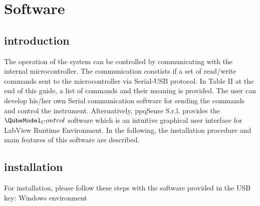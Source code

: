 
\newpage
\section{Software}
\subsection{introduction}
The operation of the \QubeModel  system can be controlled by communicating with the internal
microcontroller. The communication constists if a set of read/write commands sent to the
microcontroller via Serial-USB protocol. In Table II at the end of this guide, a list of commands and
their meaning is provided. The user can develop his/her own Serial communication software for
sending the commands and control the \QubeModel  instrument.
Alternatively, ppqSense S.r.l. provides the $\QubeModel _Control$ software which is an intuitive graphical
user interface for LabView Runtime Environment. In the following, the installation procedure and main
features of this software are described.
\subsection{installation}
For installation, please follow these steps with the software provided in the USB key:
Windows environment
